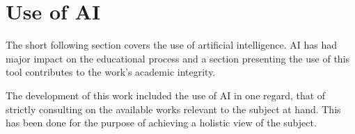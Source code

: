 \section*{Use of AI} 

The short following section covers the use of artificial intelligence. AI has had major impact on the educational process and a section 
presenting the use of this tool contributes to the work's academic integrity.

The development of this work included the use of AI in one regard, that of strictly consulting on the available works relevant to
the subject at hand. This has been done for the purpose of achieving a holistic view of the subject. 